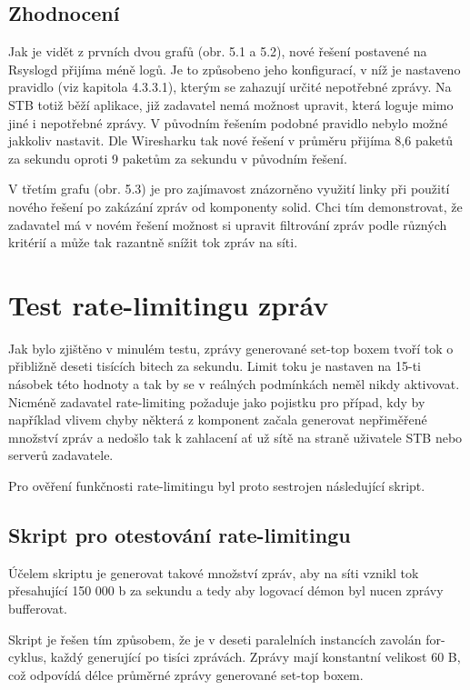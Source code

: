 \documentclass[thesis=B,czech]{FITthesis}[2012/06/26]
\begin{document}
\subsection*{Zhodnocení}
Jak je vidět z prvních dvou grafů (obr. 5.1 a 5.2), nové řešení postavené na Rsyslogd přijíma méně logů. Je to způsobeno jeho konfigurací, v níž je nastaveno pravidlo (viz kapitola 4.3.3.1), kterým se zahazují určité nepotřebné zprávy. Na STB totiž běží aplikace, již zadavatel nemá možnost upravit, která loguje mimo jiné i nepotřebné zprávy. V původním řešením podobné pravidlo nebylo možné jakkoliv nastavit.
Dle Wiresharku tak nové řešení v průměru přijíma 8,6 paketů za sekundu oproti 9 paketům za sekundu v původním řešení.

V třetím grafu (obr. 5.3) je pro zajímavost znázorněno využití linky při použití nového řešení po zakázání zpráv od komponenty solid.
Chci tím demonstrovat, že zadavatel má v novém řešení možnost si upravit filtrování zpráv podle různých kritérií a může tak razantně snížit tok zpráv na síti.

\section{Test rate-limitingu zpráv}
Jak bylo zjištěno v minulém testu, zprávy generované set-top boxem tvoří tok o přibližně deseti tisících bitech za sekundu. Limit toku je nastaven na 15-ti násobek této hodnoty a tak by se v reálných podmínkách neměl nikdy aktivovat. Nicméně zadavatel rate-limiting požaduje jako pojistku pro případ, kdy by například vlivem chyby některá z komponent začala generovat nepřiměřené množství zpráv a nedošlo tak k zahlacení ať už sítě na straně uživatele STB nebo serverů zadavatele.

Pro ověření funkčnosti rate-limitingu byl proto sestrojen následující skript.

\subsection{Skript pro otestování rate-limitingu}
Účelem skriptu je generovat takové množství zpráv, aby na síti vznikl tok přesahující 150 000 b za sekundu a tedy aby logovací démon byl nucen zprávy bufferovat.

Skript je řešen tím způsobem, že je v deseti paralelních instancích zavolán for-cyklus, každý generující po tisíci zprávách.
Zprávy mají konstantní velikost 60 B, což odpovídá délce průměrné zprávy generované set-top boxem.
\end{document}
